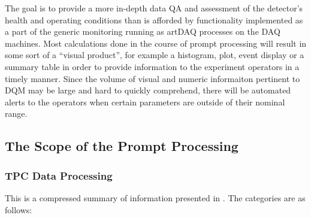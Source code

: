 \documentclass[pdftex,12pt,letter]{article}
\begin{document}
The goal is to provide a more in-depth data QA and assessment of the detector's health and operating
conditions than is afforded by functionality implemented as a part of the generic monitoring running as
artDAQ processes on the DAQ machines. Most calculations done in the course of prompt
processing will result in some sort of a ``visual product'', for example a histogram, plot, event display
or a summary table in order to provide information to the experiment operators in a timely manner.
Since the volume of visual and numeric informaiton pertinent to DQM may be large and hard
to quickly comprehend, there will be automated alerts to the operators when certain parameters
are outside of their nominal range.


\subsection{The Scope of the Prompt Processing}
\label{sec:scope}
\subsubsection{TPC Data Processing}
\label{sec:categories}
This is a compressed summary of information presented in \cite{docdb1811}.
The categories are as follows:
\end{document}

